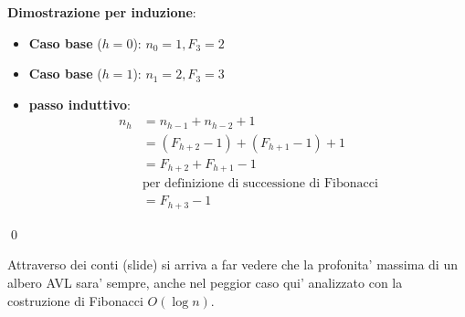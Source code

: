 \documentclass{article}
\begin{document}
\textbf{Dimostrazione per induzione}:
\begin{itemize}
  \item \textbf{Caso base} ($h=0$): $n_0 = 1, F_3 = 2$
  \item \textbf{Caso base} ($h=1$): $n_1 = 2, F_3 = 3$
  \item \textbf{passo induttivo}:
    \begin{align*}
      n_h &= n_{h-1} + n_{h-2} + 1 \\
      &= (F_{h+2}-1) + (F_{h+1}-1)+1 \\
      &= F_{h+2} + F_{h+1} - 1 \\
      &\text{per definizione di successione di Fibonacci} \\
      &= F_{h+3} - 1
    \end{align*}
\end{itemize}
\qed

Attraverso dei conti (slide) si arriva a far vedere che la profonita' massima di
un albero AVL sara' sempre, anche nel peggior caso qui' analizzato con la costruzione
di Fibonacci $O(\log n)$.
\end{document}
